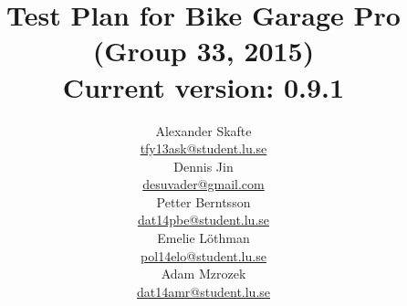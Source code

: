 \title{
	Test Plan for Bike Garage Pro\\
	(Group 33, 2015)\\
	\vspace{0.2in}
	\normalsize Current version: 0.9.1
}
\author{
	Alexander Skafte\\
	\url{tfy13ask@student.lu.se}\\
	Dennis Jin\\
	\url{desuvader@gmail.com}\\
	Petter Berntsson\\
	\url{dat14pbe@student.lu.se}\\
	Emelie Löthman\\
	\url{pol14elo@student.lu.se}\\
	Adam Mzrozek\\
	\url{dat14amr@student.lu.se}
}
\date{}

